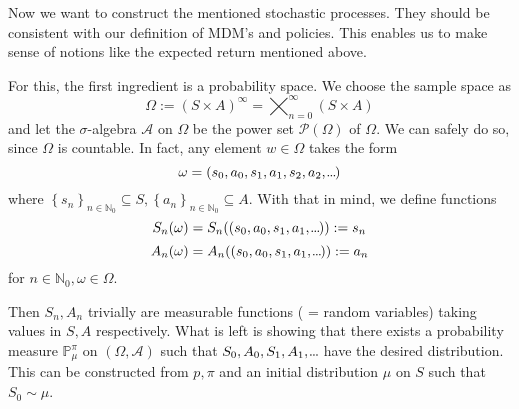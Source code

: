 Now we want to construct the mentioned stochastic processes. They should be consistent with our definition of MDM's and policies. This enables us to make sense of notions like the expected return mentioned above.

For this, the first ingredient is a probability space. We choose the sample space as 
\[
    \Omega := (S \times A)^\infty = \bigtimes_{n=0}^{\infty} (S \times A)
\]
and let the \( \sigma \)-algebra \( \mathcal{A} \) on \( \Omega \) be the power set \( \mathcal{P}(\Omega) \) of \( \Omega \). We can safely do so, since \( \Omega \) is countable. In fact, any element \( w \in \Omega  \) takes the form 
\[
    \omega = (s_{0},a_{0},s_{1},a_{1},s_{2},a_{2},\kern-0.10em.\kern-0.06em.\kern-0.06em.\kern-0.1em)
\]  
where \(  \left\{ s_n \right\}_{n \in \mathbb{N}_{0}} \subseteq S, \left\{ a_n \right\}_{n \in \mathbb{N}_{0}} \subseteq A \). With that in mind, we define functions
\[
    S_n(\omega) = S_n((s_{0},a_{0},s_{1},a_{1},\kern-0.10em.\kern-0.06em.\kern-0.06em.\kern-0.1em)) := s_n
\]
\[
    A_n(\omega) = A_n((s_{0},a_{0},s_{1},a_{1},\kern-0.10em.\kern-0.06em.\kern-0.06em.\kern-0.1em)) := a_n  
\]
for \( n \in \mathbb{N}_{0}, \omega \in \Omega \). 

Then \( S_n, A_n \) trivially are measurable functions ( = random variables) taking values in \( S, A \) respectively.  What is left is showing that there exists a probability measure \( \mathbb{P}^\pi_\mu \) on \( (\Omega, \mathcal{A}) \) such that 
\( S_{0},A_{0}, S_{1},A_{1},\kern-0.10em.\kern-0.06em.\kern-0.06em.\kern-0.1em \) have the desired distribution.
This can be constructed from \( p, \pi \)  and an initial distribution \( \mu \) on \( S \) such that \( S_{0} \sim \mu \).
